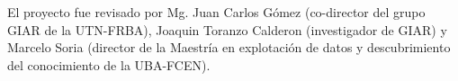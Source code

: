 El proyecto fue revisado por Mg. Juan Carlos Gómez (co-director del grupo GIAR de la UTN-FRBA), Joaquin Toranzo Calderon (investigador de GIAR) y Marcelo Soria (director de la Maestría en explotación de datos y descubrimiento del conocimiento de la UBA-FCEN).